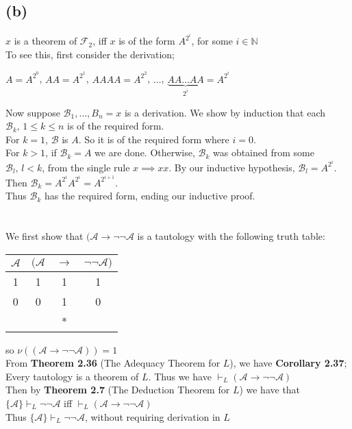 \documentclass[11pt,oneside,a4paper]{article}
\begin{document}
\subsection*{(b)}
$x$ is a theorem of $\mathcal{F}_2$, iff $x$ is of the form $A^{2^i}$, for some $i \in \mathbb{N}$\\
To see this, first consider the derivation;\\
\begin{center}
$A=A^{2^0}$, $AA=A^{2^1}$, $AAAA=A^{2^2}$, $\dots$, $\underbrace{AA\dots AA}_{2^i}=A^{2^i}$
\end{center}
Now suppose $\mathcal{B}_1, \dots, B_n=x$ is a derivation. We show by induction that each $\mathcal{B}_k, \, 1 \leq k \leq n$ is of the required form.\\
For $k=1$, $\mathcal{B}$ is $A$. So it is of the required form where $i=0$.\\
For $k > 1$, if $\mathcal{B}_k = A$ we are done. Otherwise, $\mathcal{B}_k$ was obtained from some $\mathcal{B}_l, \, l<k$, from the single rule $x \implies xx$. By our inductive hypothesis, $\mathcal{B}_l = A^{2^i}$. Then $\mathcal{B}_k = A^{2^i}A^{2^i} = A^{2^{i+1}}$.\\
Thus $\mathcal{B}_k$ has the required form, ending our inductive proof.

\section{}
We first show that $(\mathcal{A} \to \neg \neg \mathcal{A}$ is a tautology with the following truth table:
\begin{center}
\begin{tabular}{l|l|l|l}
\multicolumn{1}{c|}{$\mathcal{A}$} & \multicolumn{1}{c|}{$(\mathcal{A}$} & \multicolumn{1}{c|}{$\to$} & \multicolumn{1}{c}{$\neg \neg \mathcal{A})$} \\ 
\hline
\multicolumn{1}{c|}{1} & \multicolumn{1}{c|}{1} & \multicolumn{1}{c|}{1} & \multicolumn{1}{c}{1} \\ 
\multicolumn{1}{c|}{0} & \multicolumn{1}{c|}{0} & \multicolumn{1}{c|}{1} & \multicolumn{1}{c}{0} \\ 
\multicolumn{1}{l}{} & \multicolumn{1}{l}{} & \multicolumn{1}{c}{*} &  \\ 
\end{tabular}
\end{center}
so $\nu ((\mathcal{A} \to \neg \neg \mathcal{A})) = 1$\\
From \textbf{Theorem 2.36} (The Adequacy Theorem for $L$), we have \textbf{Corollary 2.37}; Every tautology is a theorem of $L$. Thus we have $\vdash_L (\mathcal{A} \to \neg \neg \mathcal{A})$\\
Then by \textbf{Theorem 2.7} (The Deduction Theorem for $L$) we have that $\{ \mathcal{A} \} \vdash_L \neg \neg \mathcal{A}$ iff $\vdash_L (\mathcal{A} \to \neg \neg \mathcal{A})$\\
Thus $\{ \mathcal{A} \} \vdash_L \neg \neg \mathcal{A}$, without requiring derivation in $L$
\end{document}
